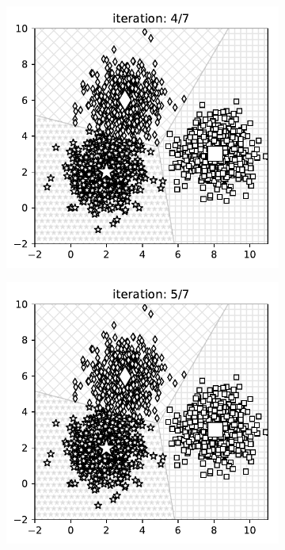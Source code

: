 \begin{figure}[t]
    \begin{subfigure}{0.325\textwidth}
    \includegraphics[width=0.99\linewidth]{ebookML_src/src/kmeans/ex_3.pdf}
    \end{subfigure}
    \begin{subfigure}{0.325\textwidth}
    \includegraphics[width=0.99\linewidth]{ebookML_src/src/kmeans/ex_4.pdf}

\end{subfigure}
\end{figure}
